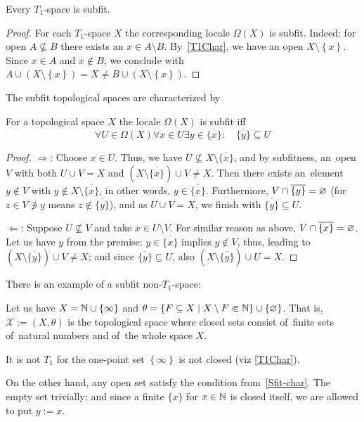 \begin{thm} \label{T1->Sfit}
  Every $T_1$-space is subfit.
\end{thm}

\begin{proof}
  For each $T_1$-space $X$ the corresponding locale $\Omega(X)$ is subfit.
  Indeed: for open $A\not\subseteq B$ there exists an $x\in A \setminus B$.
  By~\ref{T1Char}\thinspace, we have an open $X\setminus \left\{x\right\}$.
  Since $x\in A$ and $x\not\in B$, we conclude with $A\cup (X\setminus
  \left\{x\right\}) = X \ne B \cup (X\setminus \left\{x\right\})$.
\end{proof}

The subfit topological spaces are characterized by

\begin{prop} \label{Sfit-char}
  For a topological space $X$ the locale $\Omega(X)$ is subfit iff
  \[
    \forall U\in\Omega(X) \forall x\in U \exists y\in \overline{\{x\}}: \quad
    \overline{\{y\}} \subseteq U
  \]
\end{prop}
\begin{proof}
  $\Rightarrow$:
  Choose $x \in U$.
  Thus, we have $U\not\subseteq X\setminus \overline{\{x\}}$, and by
  subfitness, an~open $V$ with both $U \cup V = X$ and $(X\setminus
  \overline{\{x\}}) \cup V \ne X$.
  Then there exists an~element $y\not\in V$ with $y\not\in X\setminus
  \overline{\{x\}}$, in other words, $y\in \overline{\{x\}}$.
  Furthermore, $V \cap \overline{\{y\}} = \varnothing$ (for $z \in V \not\owns y$
  means $z\not\in \overline{\{y\}}$), and as $U \cup V = X$, we finish with
  $\overline{\{y\}} \subseteq U$.

  $\Leftarrow$:
  Suppose $U\not\subseteq V$ and take $x\in U\setminus V$.
  For similar reason as above, $V \cap \overline{\{x\}} = \varnothing$.
  Let us have $y$ from the premise:
  $y \in \overline{\{x\}}$ implies  $y\not\in V$, thus, leading to $(X\setminus
  \overline{\{y\}}) \cup V \ne X$;
  and since $\overline{\{y\}} \subseteq U$, also $(X\setminus \overline{\{y\}})
  \cup U = X$.
\end{proof}

There is an example of a subfit non-$T_1$-space:

\begin{exmpl}
  Let us have $X = \mathbb{N} \cup \left\{\infty\right\}$ and $\theta = \left\{
  F\subseteq X \mid X\setminus F \Subset \mathbb{N} \right\} \cup \left\{ \varnothing
  \right\}$.
  That is, $\mathcal{X} := (X, \theta)$ is the topological space where closed
  sets consist of~finite sets of~natural numbers and of~the whole space $X$.

  It is not $T_1$ for the one-point set $\left\{ \infty \right\}$ is not
  closed (viz \ref{T1Char}).

  On the other hand, any open set satisfy the condition
  from~\ref{Sfit-char}\thinspace.
  The empty set trivially;
  and since a finite $\{x\}$ for $x\in \mathbb{N}$ is closed itself, we are allowed to
  put $y := x$.
\end{exmpl}

%
